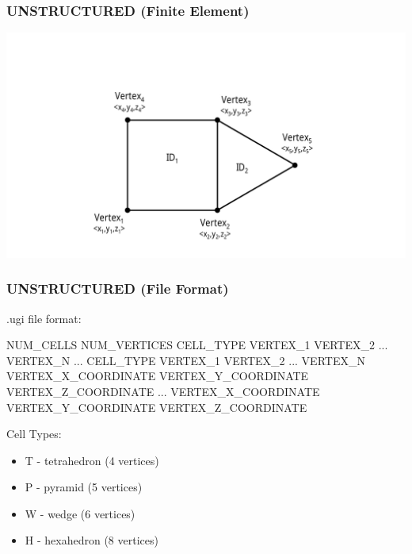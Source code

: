 \documentclass{beamer}
\begin{document}
\begin{frame}[fragile]\frametitle{UNSTRUCTURED (Finite Element)}
\vspace{0.2in}
\centering
\includegraphics[width=1\linewidth]{./fe_raw}
\end{frame}

\begin{frame}\frametitle{UNSTRUCTURED (File Format)}
.ugi file format:
\small
\begin{semiverbatim}
  NUM_CELLS NUM_VERTICES
  CELL_TYPE VERTEX_1 VERTEX_2 ... VERTEX_N
  ...
  CELL_TYPE VERTEX_1 VERTEX_2 ... VERTEX_N
  VERTEX_X_COORDINATE VERTEX_Y_COORDINATE VERTEX_Z_COORDINATE
  ...
  VERTEX_X_COORDINATE VERTEX_Y_COORDINATE VERTEX_Z_COORDINATE
\end{semiverbatim}

Cell Types:
\begin{itemize}
  \item T - tetrahedron (4 vertices)
  \item P - pyramid (5 vertices)
  \item W - wedge (6 vertices)
  \item H - hexahedron (8 vertices)
\end{itemize}
\end{frame}
\end{document}

